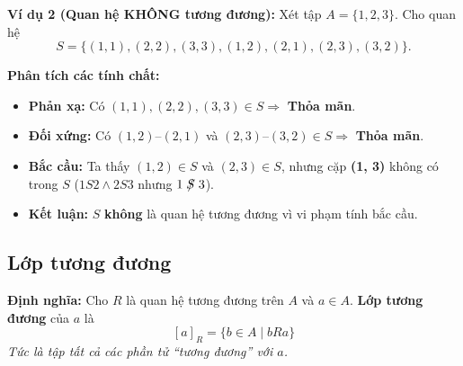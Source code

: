 \documentclass[12pt,a4paper]{article}
\newcommand{\notrel}[1]{\mathrel{\ooalign{$#1$\cr\hidewidth$/$\hidewidth}}}
\begin{document}
\vspace{6pt}
\textbf{\textcolor{AccentRed}{Ví dụ 2 (Quan hệ KHÔNG tương đương):}} Xét tập $A = \{1, 2, 3\}$. Cho quan hệ
\[
  S = \{(1, 1), (2, 2), (3, 3), (1, 2), (2, 1), (2, 3), (3, 2)\}.
\]
\noindent
\begin{minipage}[c]{0.60\textwidth}
\textbf{\textcolor{PrimaryBlue}{Phân tích các tính chất:}}
\begin{itemize}
  \item \textbf{Phản xạ:} Có $(1,1), (2,2), (3,3) \in S \Rightarrow$ \textbf{Thỏa mãn}.
  \item \textbf{Đối xứng:} Có $(1,2)\text{--}(2,1)$ và $(2,3)\text{--}(3,2) \in S \Rightarrow$ \textbf{Thỏa mãn}.
  \item \textbf{Bắc cầu:} Ta thấy $(1, 2) \in S$ và $(2, 3) \in S$, nhưng cặp \textcolor{AccentRed}{\textbf{(1, 3)}} không có trong $S$ ($1S2 \land 2S3$ nhưng $1 \notrel{S} 3$).
  \item \textbf{Kết luận:} $S$ \textbf{không} là quan hệ tương đương vì vi phạm tính bắc cầu.
\end{itemize}
\end{minipage}
\hfill
\begin{minipage}[c]{0.36\textwidth}
\centering
{}
\end{minipage}

\subsection{Lớp tương đương}

\textbf{\textcolor{AccentRed}{Định nghĩa:}} Cho $R$ là quan hệ tương đương trên $A$ và $a \in A$. \textbf{Lớp tương đương} của $a$ là
\[
  [a]_R = \{b \in A \mid bRa\}
\]
\textit{Tức là tập tất cả các phần tử ``tương đương'' với $a$.}
\end{document}
